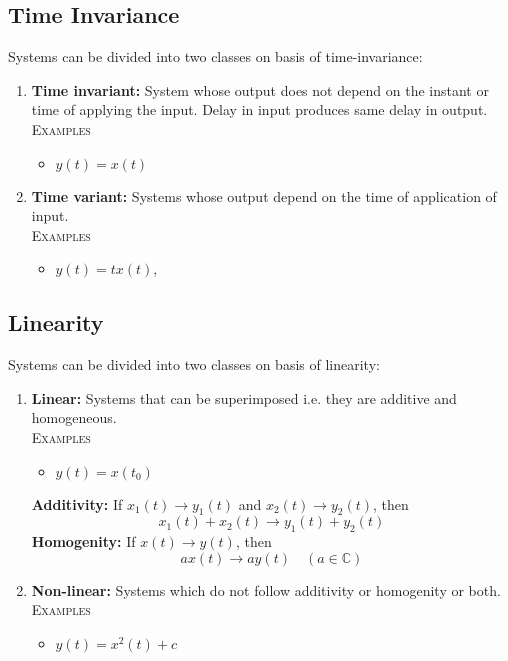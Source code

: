 \documentclass[oneside]{book}
\begin{document}
\subsection{Time Invariance}
Systems can be divided into two classes on basis of time-invariance:
\begin{enumerate}
	\item \textbf{Time invariant:} System whose output does not depend on the instant or time of applying the input. Delay in input produces same delay in output.\\
	      \textsc{Examples}
	      \begin{itemize}
		      \item \(y(t) = x(t)\)
	      \end{itemize}
	\item \textbf{Time variant:} Systems whose output depend on the time of application of input.\\
	      \textsc{Examples}
	      \begin{itemize}
		      \item \(y(t) = tx(t)\),
	      \end{itemize}
\end{enumerate}

\subsection{Linearity}
Systems can be divided into two classes on basis of linearity:
\begin{enumerate}
	\item \textbf{Linear:} Systems that can be superimposed i.e. they are additive and homogeneous.\\
	      \textsc{Examples}
	      \begin{itemize}
		      \item \(y(t) = x(t_0)\)
	      \end{itemize}
	      \textbf{Additivity:} If \(x_1(t) \rightarrow y_1(t)\) and \(x_2(t) \rightarrow y_2(t)\), then
	      \[
		      x_1(t) + x_2(t) \rightarrow y_1(t) + y_2(t)
	      \]
	      \textbf{Homogenity:} If \(x(t) \rightarrow y(t)\), then
	      \[
		      ax(t) \rightarrow ay(t)\quad (a\in\mathbb{C})
	      \]
	\item \textbf{Non-linear:} Systems which do not follow additivity or homogenity or both.\\
	      \textsc{Examples}
	      \begin{itemize}
		      \item \(y(t) = x^2(t) + c\)
	      \end{itemize}
\end{enumerate}
\end{document}
